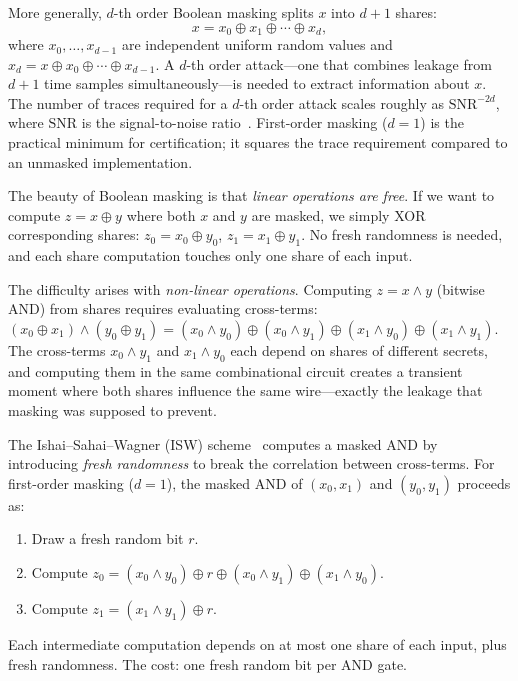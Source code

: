 More generally, $d$-th order Boolean masking splits $x$ into $d+1$ shares:
\begin{equation}
\label{eq:boolean-masking}
x = x_0 \oplus x_1 \oplus \cdots \oplus x_d,
\end{equation}
where $x_0, \ldots, x_{d-1}$ are independent uniform random values and $x_d = x \oplus x_0 \oplus \cdots \oplus x_{d-1}$.  A $d$-th order attack---one that combines leakage from $d+1$ time samples simultaneously---is needed to extract information about $x$.  The number of traces required for a $d$-th order attack scales roughly as $\text{SNR}^{-2d}$, where $\text{SNR}$ is the signal-to-noise ratio~\cite{MangardOswaldPopp2007}.  First-order masking ($d=1$) is the practical minimum for certification; it squares the trace requirement compared to an unmasked implementation.

The beauty of Boolean masking is that \emph{linear operations are free}.  If we want to compute $z = x \oplus y$ where both $x$ and $y$ are masked, we simply XOR corresponding shares: $z_0 = x_0 \oplus y_0$, $z_1 = x_1 \oplus y_1$.  No fresh randomness is needed, and each share computation touches only one share of each input.

The difficulty arises with \emph{non-linear operations}.  Computing $z = x \wedge y$ (bitwise AND) from shares requires evaluating cross-terms: $(x_0 \oplus x_1) \wedge (y_0 \oplus y_1) = (x_0 \wedge y_0) \oplus (x_0 \wedge y_1) \oplus (x_1 \wedge y_0) \oplus (x_1 \wedge y_1)$.  The cross-terms $x_0 \wedge y_1$ and $x_1 \wedge y_0$ each depend on shares of different secrets, and computing them in the same combinational circuit creates a transient moment where both shares influence the same wire---exactly the leakage that masking was supposed to prevent.

\begin{definition}
\label{def:isw}
The Ishai--Sahai--Wagner (ISW) scheme~\cite{IshaiSahaiWagner2003} computes a masked AND by introducing \emph{fresh randomness} to break the correlation between cross-terms.  For first-order masking ($d=1$), the masked AND of $(x_0, x_1)$ and $(y_0, y_1)$ proceeds as:
\begin{enumerate}
\item Draw a fresh random bit $r$.
\item Compute $z_0 = (x_0 \wedge y_0) \oplus r \oplus (x_0 \wedge y_1) \oplus (x_1 \wedge y_0)$.
\item Compute $z_1 = (x_1 \wedge y_1) \oplus r$.
\end{enumerate}
Each intermediate computation depends on at most one share of each input, plus fresh randomness.  The cost: one fresh random bit per AND gate.
\end{definition}

